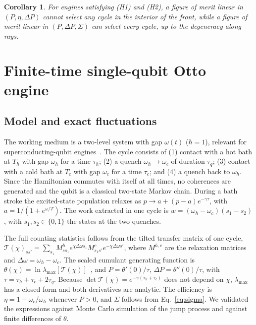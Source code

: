 \documentclass[pre,twocolumn,superscriptaddress,nofootinbib,longbibliography]{revtex4-2}
\newtheorem{corollary}{Corollary}
\begin{document}
\begin{corollary}
For engines satisfying (H1) and (H2), a figure of merit linear in $(P,\eta,\Delta P)$ cannot select
any cycle in the interior of the front, while a figure of merit linear in $(P,\Delta P,\Sigma)$
can select every cycle, up to the degeneracy along rays.
\end{corollary}

\section{Finite-time single-qubit Otto engine}
\label{sec:otto}

\subsection{Model and exact fluctuations}

The working medium is a two-level system with gap $\omega(t)$ ($\hbar = 1$), relevant for
superconducting-qubit engines~\cite{ErdmanNoe2022}. The cycle consists of (1) contact with a hot
bath at $T_h$ with gap $\omega_h$ for a time $\tau_h$; (2) a quench $\omega_h \to \omega_c$ of
duration $\tau_q$; (3) contact with a cold bath at $T_c$ with gap $\omega_c$ for a time $\tau_c$; and
(4) a quench back to $\omega_h$. Since the Hamiltonian commutes with itself at all times, no
coherences are generated and the qubit is a classical two-state Markov chain. During a bath
stroke the excited-state population relaxes as $p \to a + (p - a)e^{-\gamma\tau}$, with
$a = 1/(1+e^{\omega/T})$. The work extracted in one cycle is $w = (\omega_h - \omega_c)(s_1 - s_2)$,
with $s_1, s_2 \in \{0,1\}$ the states at the two quenches.

The full counting statistics follows from the tilted transfer matrix of one cycle,
$\mathcal{T}(\chi)_{ss'} = \sum_{s_1} M^h_{s s_1}e^{\chi\Delta\omega s_1}M^c_{s_1 s'}e^{-\chi\Delta\omega s'}$,
where $M^{h,c}$ are the relaxation matrices and $\Delta\omega = \omega_h - \omega_c$. The scaled
cumulant generating function is $\theta(\chi) = \ln\lambda_{\max}[\mathcal{T}(\chi)]$~\cite{Touchette2009},
and $P = \theta'(0)/\tau$, $\Delta P = \theta''(0)/\tau$, with
$\tau = \tau_h + \tau_c + 2\tau_q$. Because $\det\mathcal{T}(\chi) = e^{-\gamma(\tau_h+\tau_c)}$ does not
depend on $\chi$, $\lambda_{\max}$ has a closed form and both derivatives are analytic. The
efficiency is $\eta = 1 - \omega_c/\omega_h$ whenever $P > 0$, and $\Sigma$ follows from
Eq.~\eqref{eq:sigma}. We validated the expressions against Monte Carlo simulation of the jump
process and against finite differences of $\theta$.
\end{document}
